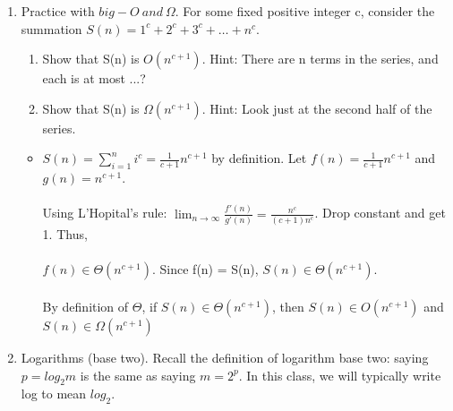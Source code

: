 \documentclass[12pt]{article}
\begin{document}
\begin{enumerate}
\newpage
\item Practice with $big-O ~and ~\Omega$. For some fixed positive integer c, consider the summation
$S(n)=1^c +2^c +3^c + \dots +n^c.$
\begin{enumerate}
	\item Show that S(n) is $O(n^{c+1})$. Hint: There are n terms in the series, and each is at most ...?
    \item Show that S(n) is $ \Omega(n^{c+1})$. Hint: Look just at the second half of the series.
\end{enumerate}
\begin{itemize}
	\item $S(n) = \sum_{i = 1}^{n}i^c = \frac{1}{c+1}n^{c+1}$ by definition. Let $f(n) = \frac{1}{c+1}n^{c+1}$ and $g(n) = n^{c+1}$. \\ \\ Using L'Hopital's rule: $\lim_{n\to\infty}\frac{f'(n)}{g'(n)} = \frac{n^c}{(c+1)n^c}$. Drop constant and get 1. Thus, \\ \\ $f(n) \in \Theta(n^{c+1})$. Since f(n) = S(n), $S(n) \in \Theta(n^{c+1})$. \\  \\By definition of $\Theta$, if $S(n) \in \Theta(n^{c+1})$, then $S(n) \in O(n^{c+1})$ and $S(n) \in \Omega(n^{c+1})$
\end{itemize}


\newpage
\item Logarithms (base two). Recall the definition of logarithm base two: saying $p = log_2 m$ is the same as saying
$m = 2^p$. In this class, we will typically write log to mean $log_2$.
\begin{enumerate}


\end{enumerate}
\end{enumerate}
\end{document}
